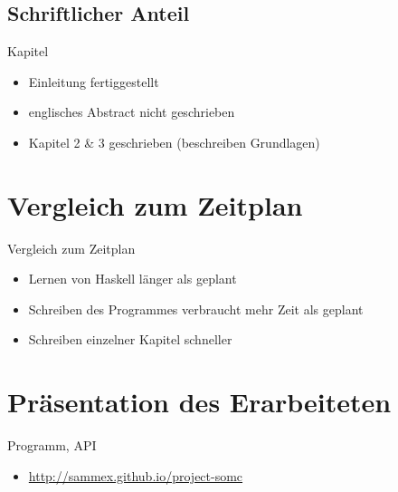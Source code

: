 \documentclass{beamer}
\begin{document}
\subsection{Schriftlicher Anteil}

\begin{frame}{Kapitel}
\begin{itemize}[<+->]
\item Einleitung fertiggestellt
\item englisches \glqq{}Abstract\grqq{} nicht geschrieben
\item Kapitel 2 \& 3 geschrieben (beschreiben Grundlagen)
\end{itemize}
\end{frame}

\section{Vergleich zum Zeitplan}

\begin{frame}{Vergleich zum Zeitplan}
\begin{itemize}[<+->]
\item Lernen von Haskell länger als geplant
\item Schreiben des Programmes verbraucht mehr Zeit als geplant
\item Schreiben einzelner Kapitel schneller
\end{itemize}
\end{frame}

\section{Präsentation des Erarbeiteten}

\begin{frame}{Programm, API}
\begin{itemize}
\item \url{http://sammex.github.io/project-somc}
\end{itemize}
\end{frame}
\end{document}
